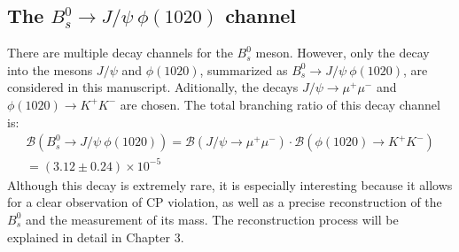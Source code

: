 \subsection{The $B^0_s \to J/\psi \ \phi(1020)$ channel}
There are multiple decay channels for the $B^0_s$ meson. However, only the decay into the mesons $J/\psi$ and $\phi(1020)$, summarized as $B^0_s \to J/\psi \ \phi(1020)$, are considered in this manuscript. Aditionally, the decays $J/\psi \to \mu^{+} \mu^{-}$ and $\phi(1020) \to K^{+} K^{-}$ are chosen. The total branching ratio of this decay channel is:
\begin{equation}
	\begin{split}
	\mathcal{B} \left(B^0_s \to J/\psi \ \phi(1020) \right) = 	\mathcal{B} \left(J/\psi \to \mu^{+} \mu^{-} \right) \cdot \mathcal{B} \left(\phi(1020) \to K^{+} K^{-} \right)  
	\\  = (3.12 \pm 0.24) \times 10^{-5}
	\end{split}
\end{equation}
Although this decay is extremely rare, it is especially interesting because it allows for a clear observation of CP violation, as well as a precise reconstruction of the $B^0_s$ and the measurement of its mass. The reconstruction process will be explained in detail in Chapter 3.